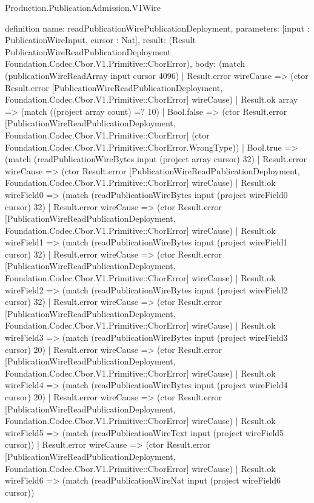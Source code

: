 \begin{lexlean}{Production.PublicationAdmission.V1Wire}
\begin{semanticmodule}
definition{
  name: readPublicationWirePublicationDeployment,
  parameters: [input : PublicationWireInput, cursor : Nat],
  result: (Result PublicationWireReadPublicationDeployment Foundation.Codec.Cbor.V1.Primitive::CborError),
  body: (match (publicationWireReadArray input cursor 4096)
    | Result.error wireCause => (ctor Result.error [PublicationWireReadPublicationDeployment, Foundation.Codec.Cbor.V1.Primitive::CborError] wireCause)
    | Result.ok array => (match ((project array count) =? 10)
      | Bool.false => (ctor Result.error [PublicationWireReadPublicationDeployment, Foundation.Codec.Cbor.V1.Primitive::CborError] (ctor Foundation.Codec.Cbor.V1.Primitive::CborError.WrongType))
      | Bool.true => (match (readPublicationWireBytes input (project array cursor) 32)
        | Result.error wireCause => (ctor Result.error [PublicationWireReadPublicationDeployment, Foundation.Codec.Cbor.V1.Primitive::CborError] wireCause)
        | Result.ok wireField0 => (match (readPublicationWireBytes input (project wireField0 cursor) 32)
          | Result.error wireCause => (ctor Result.error [PublicationWireReadPublicationDeployment, Foundation.Codec.Cbor.V1.Primitive::CborError] wireCause)
          | Result.ok wireField1 => (match (readPublicationWireBytes input (project wireField1 cursor) 32)
            | Result.error wireCause => (ctor Result.error [PublicationWireReadPublicationDeployment, Foundation.Codec.Cbor.V1.Primitive::CborError] wireCause)
            | Result.ok wireField2 => (match (readPublicationWireBytes input (project wireField2 cursor) 32)
              | Result.error wireCause => (ctor Result.error [PublicationWireReadPublicationDeployment, Foundation.Codec.Cbor.V1.Primitive::CborError] wireCause)
              | Result.ok wireField3 => (match (readPublicationWireBytes input (project wireField3 cursor) 20)
                | Result.error wireCause => (ctor Result.error [PublicationWireReadPublicationDeployment, Foundation.Codec.Cbor.V1.Primitive::CborError] wireCause)
                | Result.ok wireField4 => (match (readPublicationWireBytes input (project wireField4 cursor) 20)
                  | Result.error wireCause => (ctor Result.error [PublicationWireReadPublicationDeployment, Foundation.Codec.Cbor.V1.Primitive::CborError] wireCause)
                  | Result.ok wireField5 => (match (readPublicationWireText input (project wireField5 cursor))
                    | Result.error wireCause => (ctor Result.error [PublicationWireReadPublicationDeployment, Foundation.Codec.Cbor.V1.Primitive::CborError] wireCause)
                    | Result.ok wireField6 => (match (readPublicationWireNat input (project wireField6 cursor))
}
\end{semanticmodule}
\end{lexlean}
